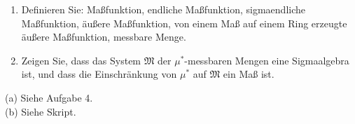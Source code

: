 
\begin{exercise}

\phantom{}

\begin{enumerate}[label = (\alph*)]

  \item
  Definieren Sie: Maßfunktion, endliche Maßfunktion, sigmaendliche Maßfunktion, äußere Maßfunktion, von einem Maß auf einem Ring erzeugte äußere Maßfunktion, messbare Menge.
  
  \item
  Zeigen Sie, dass das System $\mathfrak{M}$ der $\mu^\ast$-messbaren Mengen eine Sigmaalgebra ist, und dass die Einschränkung von $\mu^\ast$ auf $\mathfrak{M}$ ein Maß ist.

\end{enumerate}

\end{exercise}


\begin{solution}

(a) Siehe Aufgabe 4. \\

(b) Siehe Skript.

\end{solution}

